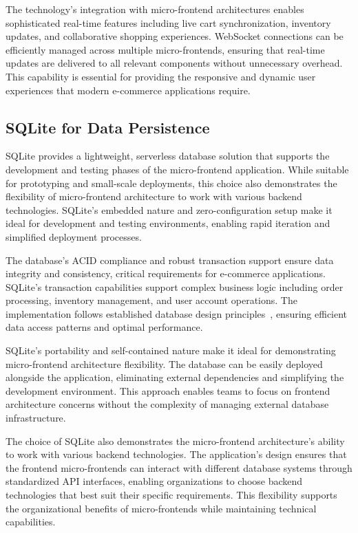 \documentclass[12pt,a4paper]{report}
\begin{document}
The technology's integration with micro-frontend architectures enables sophisticated real-time features including live cart synchronization, inventory updates, and collaborative shopping experiences. WebSocket connections can be efficiently managed across multiple micro-frontends, ensuring that real-time updates are delivered to all relevant components without unnecessary overhead. This capability is essential for providing the responsive and dynamic user experiences that modern e-commerce applications require.

\subsection{SQLite for Data Persistence}

SQLite provides a lightweight, serverless database solution that supports the development and testing phases of the micro-frontend application. While suitable for prototyping and small-scale deployments, this choice also demonstrates the flexibility of micro-frontend architecture to work with various backend technologies. SQLite's embedded nature and zero-configuration setup make it ideal for development and testing environments, enabling rapid iteration and simplified deployment processes.

The database's ACID compliance and robust transaction support ensure data integrity and consistency, critical requirements for e-commerce applications. SQLite's transaction capabilities support complex business logic including order processing, inventory management, and user account operations. The implementation follows established database design principles~\cite{date2003introduction}, ensuring efficient data access patterns and optimal performance.

SQLite's portability and self-contained nature make it ideal for demonstrating micro-frontend architecture flexibility. The database can be easily deployed alongside the application, eliminating external dependencies and simplifying the development environment. This approach enables teams to focus on frontend architecture concerns without the complexity of managing external database infrastructure.

The choice of SQLite also demonstrates the micro-frontend architecture's ability to work with various backend technologies. The application's design ensures that the frontend micro-frontends can interact with different database systems through standardized API interfaces, enabling organizations to choose backend technologies that best suit their specific requirements. This flexibility supports the organizational benefits of micro-frontends while maintaining technical capabilities.
\end{document}
